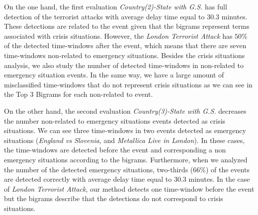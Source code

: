 \documentclass[sigconf]{acmart}
\begin{document}
On the one hand, the first evaluation \textit{Country(2)-State with G.S.} has full detection of the terrorist attacks with average delay time equal to $30.3$ minutes. These detections are related to the event given that the bigrams represent terms associated with crisis situations. However, the \textit{London Terrorist Attack} has $50\%$ of the detected time-windows after the event, which means that there are seven time-windows non-related to emergency situations. Besides the crisis situations analysis, we also study the number of detected time-windows in non-related to emergency situation events. In the same way, we have a large amount of misclassified time-windows that do not represent crisis situations as we can see in the Top 3 Bigrams for each non-related to event.



On the other hand, the second evaluation \textit{Country(3)-State with G.S.} decreases the number non-related to emergency situations events detected as crisis situations. We can see three time-windows in two events detected as emergency situations (\textit{England vs Slovenia}, and \textit{Metallica Live in London}). In these cases, the time-windows are detected before the event and corresponding a non emergency situations according to the bigrams. Furthermore, when we analyzed the number of the detected emergency situations, two-thirds ($66\%$) of the events are detected correctly with average delay time equal to $30.3$ minutes. In the case of \textit{London Terrorist Attack}, our method detects one time-window before the event but the bigrams describe that the detections do not correspond to crisis situations.

\end{document}
